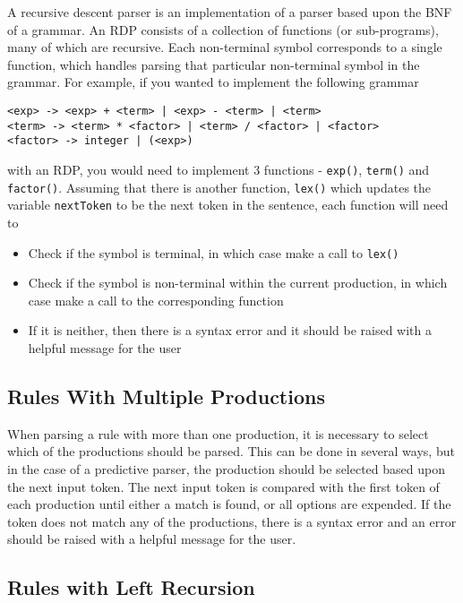 A recursive descent parser is an implementation of a parser based upon the BNF of a grammar. An RDP consists of a
 collection of functions (or sub-programs), many of which are recursive. Each non-terminal symbol corresponds to a
 single function, which handles parsing that particular non-terminal symbol in the grammar. For example, if you wanted
 to implement the following grammar
\begin{verbatim}
<exp> -> <exp> + <term> | <exp> - <term> | <term>
<term> -> <term> * <factor> | <term> / <factor> | <factor>
<factor> -> integer | (<exp>)
\end{verbatim}
with an RDP, you would need to implement 3 functions - \verb`exp()`, \verb`term()` and \verb`factor()`. Assuming that
 there is another function, \verb`lex()` which updates the variable \verb`nextToken` to be the next token in the
 sentence, each function will need to
\begin{itemize}
  \item Check if the symbol is terminal, in which case make a call to \verb`lex()`
  \item Check if the symbol is non-terminal within the current production, in which case make a call to the corresponding
   function
  \item If it is neither, then there is a syntax error and it should be raised with a helpful message for the user
\end{itemize}

\subsection*{Rules With Multiple Productions}

When parsing a rule with more than one production, it is necessary to select which of the productions should be parsed.
 This can be done in several ways, but in the case of a predictive parser, the production should be selected based upon
 the next input token. The next input token is compared with the first token of each production until either a match is
 found, or all options are expended. If the token does not match any of the productions, there is a syntax error and an
 error should be raised with a helpful message for the user.

\subsection*{Rules with Left Recursion}

